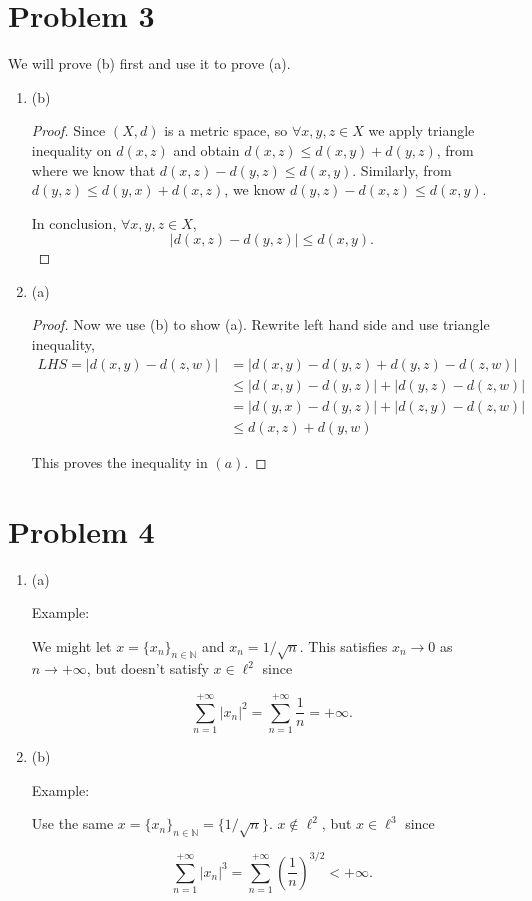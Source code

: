 \documentclass[12pt]{article}
\begin{document}
\section*{Problem 3}

We will prove (b) first and use it to prove (a).

\begin{enumerate}
\item (b)
\begin{proof}
Since $(X,d)$ is a metric space, so $\forall x, y ,z \in X$ we apply triangle inequality on $d(x, z)$ and obtain $d(x, z) \leqslant d(x, y) + d(y, z)$, from where we know that $d(x, z)- d(y, z) \leqslant d(x, y)$. Similarly, from $d(y, z) \leqslant d(y, x) + d(x, z)$, we know $d(y, z)- d(x, z) \leqslant d(x, y)$.

In conclusion, $\forall x, y, z \in X$, 
$$
|d(x, z)- d(y, z)| \leqslant d(x, y).
$$

\end{proof}

\item (a)

\begin{proof}

Now we use (b) to show (a). Rewrite left hand side and use triangle inequality,
$$
\begin{aligned}
LHS = |d(x, y) - d(z, w)| & = |d(x, y) - d(y, z) + d(y, z) - d(z, w)| \\
& \leqslant |d(x, y) - d(y, z)| + |d(y, z) - d(z, w)| \\
& = |d(y, x) - d(y, z)| + |d(z, y) - d(z, w)| \\
& \leqslant d(x, z) + d(y, w)
\end{aligned}
$$

This proves the inequality in $(a)$.

\end{proof}

\end{enumerate}

\section*{Problem 4}

\begin{enumerate}
\item (a) 

Example:

We might let $x = \{x_n\}_{n\in\mathbb{N}}$ and $x_n = 1/\sqrt{n}$. This satisfies $x_n \rightarrow 0$ as $n \rightarrow +\infty$, but doesn't satisfy $x \in \ell^2$ since

$$
\sum_{n = 1}^{+\infty} |x_n|^2 = \sum_{n = 1}^{+\infty} \frac{1}{n} = +\infty.
$$

\item (b)

Example: 

Use the same $x = \{x_n\}_{n\in\mathbb{N}} = \{1/\sqrt{n}\}$. $x \notin \ell^2$, but $x \in \ell^3$ since 

$$
\sum_{n = 1}^{+\infty} |x_n|^3 = \sum_{n = 1}^{+\infty}\left(\frac{1}{n}\right)^{3/2} < +\infty.
$$

\end{enumerate}
\end{document}
